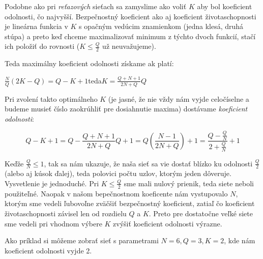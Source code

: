 Podobne ako pri \textit{reťazových} sieťach sa zamyslime ako voliť $K$ aby bol
koeficient odolnosti, čo najvyšší. Bezpečnostný koeficient ako aj koeficient
životaschopnosti je lineárna funkcia v $K$ s opačným vedúcim znamienkom
(jedna klesá, druhá stúpa) a preto keď chceme maximalizovať minimum z týchto
dvoch funkcií, stačí ich položiť do rovnosti ($K\leq\frac{Q}{2}$ už neuvažujeme).

Teda maximálny koeficient odolnosti získame ak platí:

\centerline{$\frac{N}{Q}(2K-Q)=Q-K+1$\hspace{10mm}teda\hspace{10mm}$K=\frac{Q+N+1}{2N+Q}Q$}

Pri zvolení takto optimálneho $K$ (je jasné, že nie vždy nám vyjde celočíselne a budeme
musieť číslo zaokrúhliť pre dosiahnutie maxima) dostávame \textit{koeficient odolnosti}:

$$Q-K+1=Q-\frac{Q+N+1}{2N+Q}Q+1=Q(\frac{N-1}{2N+Q})+1=\frac{Q-\frac{Q}{N}}{2+\frac{Q}{N}}+1$$

Keďže $\frac{Q}{N}\leq 1$, tak sa nám ukazuje, že naša sieť sa vie dostať blízko ku odolnosti
$\frac{Q}{2}$ (alebo aj kúsok ďalej), teda polovici počtu uzlov, ktorým jeden dôveruje.
Vysvetlenie je jednoduché. Pri $K\leq\frac{Q}{2}$ sme mali nulový prienik, teda siete neboli
použiteľné. Naopak v našom bepečnostnom koeficente nám vystupovalo $N$, ktorým sme vedeli
ľubovoľne zväčšiť bezpečnostný koeficient, zatiaľ čo koeficient životaschopnosti
závisel len od rozdielu $Q$ a $K$. Preto pre dostatočne veľké siete sme vedeli pri vhodnom
výbere $K$ zvýšiť koeficient odolnosti výrazne.

Ako príklad si môžeme zobrať sieť s parametrami $N=6, Q=3, K=2$, kde nám koeficient odolnosti
vyjde 2.
